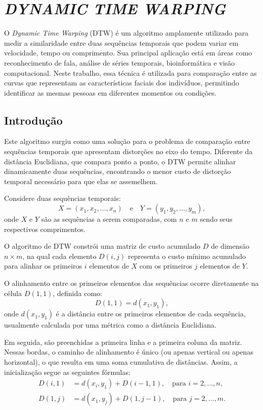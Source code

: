 \chapter{\textit{DYNAMIC TIME WARPING}} \label{cha:dtw}

O \textit{Dynamic Time Warping} (DTW) \cite{tavenard.blog.dtw} é um algoritmo amplamente utilizado para medir a similaridade entre duas sequências temporais que podem variar em velocidade, tempo ou comprimento. Sua principal aplicação está em áreas como reconhecimento de fala, análise de séries temporais, bioinformática e visão computacional. Neste trabalho, essa técnica é utilizada para comparação entre as curvas que representam as características faciais dos indivíduos, permitindo identificar as mesmas pessoas em diferentes momentos ou condições.

\section{Introdução}

Este algoritmo surgiu como uma solução para o problema de comparação entre sequências temporais que apresentam distorções no eixo do tempo. Diferente da distância Euclidiana, que compara ponto a ponto, o DTW permite alinhar dinamicamente duas sequências, encontrando o menor custo de distorção temporal necessário para que elas se assemelhem.

Considere duas sequências temporais:
\begin{equation}
    X = (x_1, x_2, \ldots, x_n) \quad \text{e} \quad Y = (y_1, y_2, \ldots, y_m),
\end{equation}
onde \(X\) e \(Y\) são as sequências a serem comparadas, com \(n\) e \(m\) sendo seus respectivos comprimentos.

O algoritmo de DTW constrói uma matriz de custo acumulado \(D\) de dimensão \(n \times m\), na qual cada elemento \(D(i, j)\) representa o custo mínimo acumulado para alinhar os primeiros \(i\) elementos de \(X\) com os primeiros \(j\) elementos de \(Y\).

O alinhamento entre os primeiros elementos das sequências ocorre diretamente na célula \(D(1,1)\), definida como:
\begin{equation}
    D(1,1) = d(x_1, y_1),
\end{equation}
onde \(d(x_1, y_1)\) é a distância entre os primeiros elementos de cada sequência, usualmente calculada por uma métrica como a distância Euclidiana.

Em seguida, são preenchidas a primeira linha e a primeira coluna da matriz. Nessas bordas, o caminho de alinhamento é único (ou apenas vertical ou apenas horizontal), o que resulta em uma soma cumulativa de distâncias. Assim, a inicialização segue as seguintes fórmulas:
\begin{align}
    D(i,1) &= d(x_i, y_1) + D(i-1,1), \quad \text{para } i = 2, \ldots, n, \\
    D(1,j) &= d(x_1, y_j) + D(1,j-1), \quad \text{para } j = 2, \ldots, m.
\end{align}

